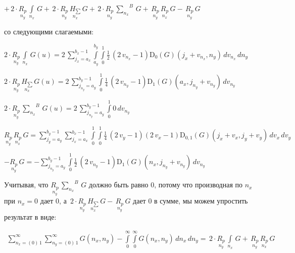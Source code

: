 \documentclass[11pt]{article}
\begin{document}
    \(+\,2\cdot\underset{n_y}{R_{p}}\,\int\limits_{n_x}^{}\,G +\,2\cdot\underset{n_y}{R_{p}}\,\underset{n_x}{H_{\sum}}\,G +\,2\cdot\underset{n_y}{R_{p}}\,{\sum\limits_{n_x}^{}}^{B}\,G +\,\underset{n_y}{R_{p}}\,\underset{n_x}{R_{p}}\,G -\,\underset{n_y}{R_{p}}\,G\)

    со следующими слагаемыми:

\(2\cdot\underset{n_y}{R_{p}}\,\int\limits_{n_x}^{}\,G\left(u\right) = 2 \, {\sum\limits_{j_{x}=a_{x}}^{b_{x} - 1} \int\limits_{a_{y}}^{b_{y}} \int\limits_{0}^{1} \frac{1}{2} \, {\left(2 \, v_{n_{x}} - 1\right)} \mathrm{D}_{0}\left(G\right)\left(j_{x} + v_{n_{x}}, n_{y}\right)\,{d v_{n_{x}}}\,{d n_{y}}}\)

\(2\cdot\underset{n_y}{R_{p}}\,\underset{n_x}{H_{\sum}}\,G\left(u\right) = 2 \, {\sum\limits_{j_{n_{y}}=a_{y}}^{b_{y} - 1} \int\limits_{0}^{1} \frac{1}{4} \, {\left(2 \, v_{n_{y}} - 1\right)} \mathrm{D}_{1}\left(G\right)\left(a_{x}, j_{n_{y}} + v_{n_{y}}\right)\,{d v_{n_{y}}}}\)

\(2\cdot\underset{n_y}{R_{p}}\,{\sum\limits_{n_x}^{}}^{B}\,G\left(u\right) = 2 \, {\sum\limits_{j_{n_{y}}=a_{y}}^{b_{y} - 1} \int\limits_{0}^{1} 0\,{d v_{n_{y}}}}\)

\(\underset{n_y}{R_{p}}\,\underset{n_x}{R_{p}}\,G = {\sum\limits_{j_{y}=a_{y}}^{b_{y} - 1} {\sum\limits_{j_{x}=a_{x}}^{b_{x} - 1} \int\limits_{0}^{1} \int\limits_{0}^{1} \frac{1}{4} \, {\left(2 \, v_{y} - 1\right)} {\left(2 \, v_{x} - 1\right)} \mathrm{D}_{0, 1}\left(G\right)\left(j_{x} + v_{x}, j_{y} + v_{y}\right)\,{d v_{x}}}\,{d v_{y}}}\)

\(-\underset{n_y}{R_{p}}\,G = -{\sum\limits_{j_{n_{y}}=a_{y}}^{b_{y} - 1} \int\limits_{0}^{1} \frac{1}{2} \, {\left(2 \, v_{n_{y}} - 1\right)} \mathrm{D}_{1}\left(G\right)\left(n_{x}, j_{n_{y}} + v_{n_{y}}\right)\,{d v_{n_{y}}}}\)

    Учитывая, что \(\underset{n_y}{R_{p}}\,{\sum\limits_{n_x}^{}}^{B}\,G\)
должно быть равно \(0\), потому что производная по \(n_x\) при
\(n_x = 0\) дает \(0\), а
\(\,2\cdot\underset{n_y}{R_{p}}\,\underset{n_x}{H_{\sum}}\,G -\,\underset{n_y}{ R_{p}}\,G\)
дает \(0\) в сумме, мы можем упростить результат в виде:

    \begin{equation}
\begin{array}{r}
\sum\limits_{n_x=\left(0\right)\,1}^{\infty}
\sum\limits_{n_y=\left(0\right)\,1}^{\infty}
G\left(n_x, n_y\right)
-
\int\limits_{0}^{\infty}
\int\limits_{0}^{\infty}
G\left(n_x, n_y\right)\,d{n_x}\,d{n_y} =
\,2\cdot\underset{n_y}{R_{p}}\,\int\limits_{n_x}^{}\,G 
+\,\underset{n_y}{R_{p}}\,\underset{n_x}{R_{p}}\,G
\end{array}
\end{equation}
\end{document}
